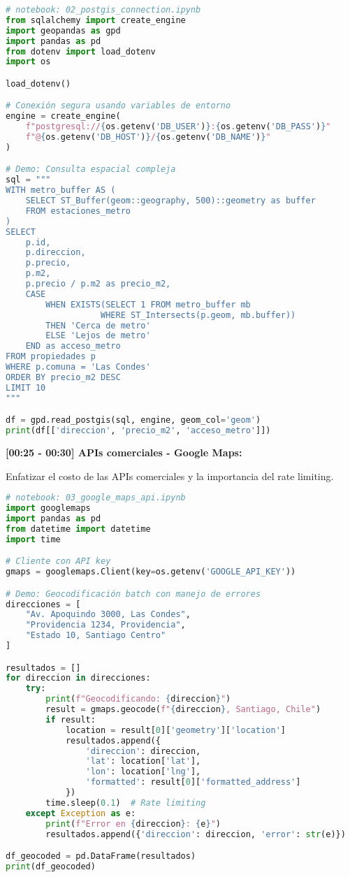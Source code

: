 \documentclass[11pt,a4paper]{article}
\begin{document}
\begin{lstlisting}[language=Python]
# notebook: 02_postgis_connection.ipynb
from sqlalchemy import create_engine
import geopandas as gpd
import pandas as pd
from dotenv import load_dotenv
import os

load_dotenv()

# Conexión segura usando variables de entorno
engine = create_engine(
    f"postgresql://{os.getenv('DB_USER')}:{os.getenv('DB_PASS')}"
    f"@{os.getenv('DB_HOST')}/{os.getenv('DB_NAME')}"
)

# Demo: Consulta espacial compleja
sql = """
WITH metro_buffer AS (
    SELECT ST_Buffer(geom::geography, 500)::geometry as buffer
    FROM estaciones_metro
)
SELECT 
    p.id,
    p.direccion,
    p.precio,
    p.m2,
    p.precio / p.m2 as precio_m2,
    CASE 
        WHEN EXISTS(SELECT 1 FROM metro_buffer mb 
                   WHERE ST_Intersects(p.geom, mb.buffer))
        THEN 'Cerca de metro'
        ELSE 'Lejos de metro'
    END as acceso_metro
FROM propiedades p
WHERE p.comuna = 'Las Condes'
ORDER BY precio_m2 DESC
LIMIT 10
"""

df = gpd.read_postgis(sql, engine, geom_col='geom')
print(df[['direccion', 'precio_m2', 'acceso_metro']])
\end{lstlisting}

\textbf{[00:25 - 00:30] APIs comerciales - Google Maps:}

\begin{tipbox}
Enfatizar el costo de las APIs comerciales y la importancia del rate limiting.
\end{tipbox}

\begin{lstlisting}[language=Python]
# notebook: 03_google_maps_api.ipynb
import googlemaps
import pandas as pd
from datetime import datetime
import time

# Cliente con API key
gmaps = googlemaps.Client(key=os.getenv('GOOGLE_API_KEY'))

# Demo: Geocodificación batch con manejo de errores
direcciones = [
    "Av. Apoquindo 3000, Las Condes",
    "Providencia 1234, Providencia",
    "Estado 10, Santiago Centro"
]

resultados = []
for direccion in direcciones:
    try:
        print(f"Geocodificando: {direccion}")
        result = gmaps.geocode(f"{direccion}, Santiago, Chile")
        if result:
            location = result[0]['geometry']['location']
            resultados.append({
                'direccion': direccion,
                'lat': location['lat'],
                'lon': location['lng'],
                'formatted': result[0]['formatted_address']
            })
        time.sleep(0.1)  # Rate limiting
    except Exception as e:
        print(f"Error en {direccion}: {e}")
        resultados.append({'direccion': direccion, 'error': str(e)})

df_geocoded = pd.DataFrame(resultados)
print(df_geocoded)
\end{lstlisting}
\end{document}
